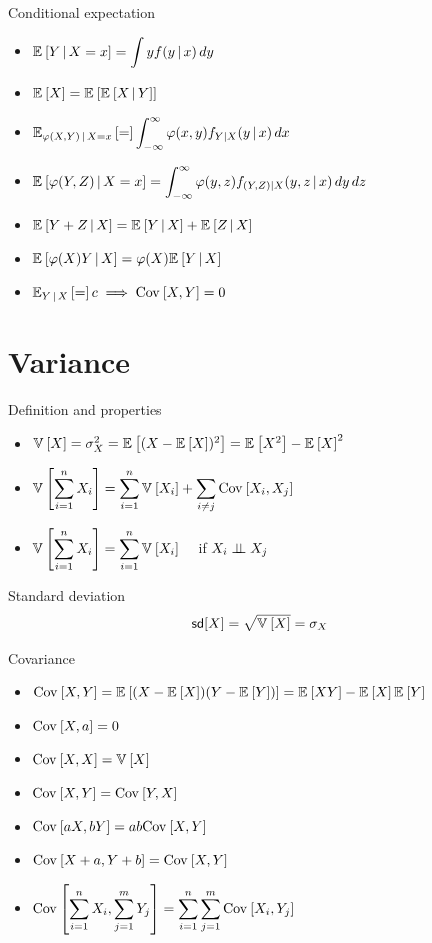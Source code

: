 \documentclass[landscape]{article}
\newenvironment{titemize}[1]{
  \begin{minipage}[h]{\columnwidth}
    #1
    \begin{itemize}
}{
    \end{itemize}
  \end{minipage}
}
\begin{document}
\begin{multicols*}{2}
\begin{titemize}{Conditional expectation}
  \item $\E{Y\giv X=x} = \displaystyle\int y f(y\giv x)\dy$
  \item $\E{X} = \E{\E{X\giv Y}}$
  \item $\E[\transform(X,Y)\giv X=x]
    = \displaystyle\int_{-\infty}^\infty \transform(x,y)f_{Y|X}(y\giv x)\dx$
  \item $\E{\transform(Y,Z)\giv X=x} =
    \displaystyle\int_{-\infty}^\infty\transform(y,z)
    f_{(Y,Z)|X}(y,z\giv x)\,dy\,dz$
  \item $\E{Y+Z\giv X} = \E{Y\giv X} + \E{Z\giv X}$
  \item $\E{\transform(X)Y\giv X} = \transform(X)\E{Y\giv X}$
  \item $\E[Y\giv X] = c \imp \cov{X,Y}=0$
\end{titemize}

\section{Variance}

\begin{titemize}{Definition and properties}
  \item $\V{X} = \sigma_X^2 = \E{(X-\E{X})^2} = \E{X^2} - \E{X}^2$
  \item $\V{\displaystyle\sum_{i=1}^n X_i} =
    \displaystyle\sum_{i=1}^n \V{X_i} + \sum_{i\ne j}\cov{X_i,X_j}$
  \item $\V{\displaystyle\sum_{i=1}^n X_i} =
    \displaystyle\sum_{i=1}^n\V{X_i} \quad$ if $X_i \ind X_j$
\end{titemize}

Standard deviation
\[\sd[X] = \sqrt{\V{X}} = \sigma_X\]

Covariance
\begin{itemize}
  \item $\cov{X,Y} = \E{(X-\E{X})(Y-\E{Y})} = \E{XY}-\E{X}\E{Y}$
  \item $\cov{X,a} = 0$
  \item $\cov{X,X} = \V{X}$
  \item $\cov{X,Y} = \cov{Y,X}$
  \item $\cov{aX,bY} = ab\cov{X,Y}$
  \item $\cov{X+a,Y+b} = \cov{X,Y}$
  \item $\cov{\displaystyle\sumin X_i, \sumjm Y_j}
    = \displaystyle\sumin\sumjm\cov{X_i, Y_j}$
\end{itemize}


\end{multicols*}
\end{document}
